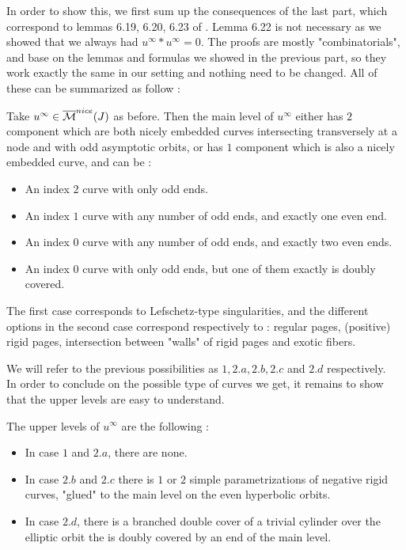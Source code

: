 \documentclass[../main.tex]{subfiles}
\begin{document}
In order to show this, we first sum up the consequences of the last part, which correspond to lemmas 6.19, 6.20, 6.23 of \cite{SOBD2}. Lemma 6.22 is not necessary as we showed that we always had $u^\infty *u ^\infty = 0$. The proofs are mostly "combinatorials", and base on the lemmas and formulas we showed in the previous part, so they work exactly the same in our setting and nothing need to be changed. All of these can be summarized as follow :

\begin{lemma}
Take $u^\infty\in\overline{\mathcal{M}}^{nice}(J)$ as before. Then the main level of $u^\infty$ either has $2$ component which are both nicely embedded curves intersecting transversely at a node and with odd asymptotic orbits, or has $1$ component which is also a nicely embedded curve, and can be :
\begin{itemize}
    \item An index $2$ curve with only odd ends.
    \item An index $1$ curve with any number of odd ends, and exactly one even end.
    \item An index $0$ curve with any number of odd ends, and exactly two even ends.
    \item An index $0$ curve with only odd ends, but one of them exactly is doubly covered.
\end{itemize}
\end{lemma}

\begin{remark}
The first case corresponds to Lefschetz-type singularities, and the different options in the second case correspond respectively to : regular pages, (positive) rigid pages, intersection between "walls" of rigid pages and exotic fibers.
\end{remark}

We will refer to the previous possibilities as $1, 2.a,2.b,2.c$ and $2.d$ respectively.\\
In order to conclude on the possible type of curves we get, it remains to show that the upper levels are easy to understand. 

\begin{lemma}
The upper levels of $u^\infty$ are the following :
\begin{itemize}
    \item In case $1$ and $2.a$, there are none.
    \item In case $2.b$ and $2.c$ there is $1$ or $2$ simple parametrizations of negative rigid curves, "glued" to the main level on the even hyperbolic orbits.
    \item In case $2.d$, there is a branched double cover of a trivial cylinder over the elliptic orbit the is doubly covered by an end of the main level.
\end{itemize}
\end{lemma}
\end{document}
